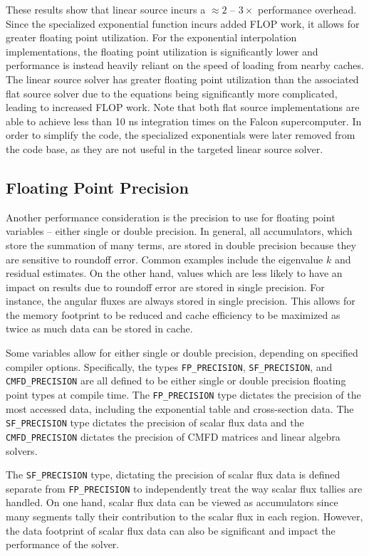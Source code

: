 These results show that linear source incurs a $\approx 2$ -- $3\times$ performance overhead. Since the specialized exponential function incurs added \ac{FLOP} work, it allows for greater floating point utilization. For the exponential interpolation implementations, the floating point utilization is significantly lower and performance is instead heavily reliant on the speed of loading from nearby caches. The linear source solver has greater floating point utilization than the associated flat source solver due to the equations being significantly more complicated, leading to increased \ac{FLOP} work. Note that both flat source implementations are able to achieve less than 10 ns integration times on the Falcon supercomputer. In order to simplify the code, the specialized exponentials were later removed from the code base, as they are not useful in the targeted linear source solver.


\subsection{Floating Point Precision}

Another performance consideration is the precision to use for floating point variables -- either single or double precision. In general, all accumulators, which store the summation of many terms, are stored in double precision because they are sensitive to roundoff error. Common examples include the eigenvalue $k$ and residual estimates. On the other hand, values which are less likely to have an impact on results due to roundoff error are stored in single precision.  For instance, the angular fluxes are always stored in single precision. This allows for the memory footprint to be reduced and cache efficiency to be maximized as twice as much data can be stored in cache.

Some variables allow for either single or double precision, depending on specified compiler options. Specifically, the types \texttt{FP_PRECISION}, \texttt{SF_PRECISION}, and \newline \texttt{CMFD_PRECISION} are all defined to be either single or double precision floating point types at compile time. The \texttt{FP_PRECISION} type dictates the precision of the most accessed data, including the exponential table and cross-section data.  The \texttt{SF_PRECISION} type dictates the precision of scalar flux data and the \texttt{CMFD_PRECISION} dictates the precision of CMFD matrices and linear algebra solvers.

The \texttt{SF_PRECISION} type, dictating the precision of scalar flux data is defined separate from \texttt{FP_PRECISION} to independently treat the way scalar flux tallies are handled. On one hand, scalar flux data can be viewed as accumulators since many segments tally their contribution to the scalar flux in each region. However, the data footprint of scalar flux data can also be significant and impact the performance of the solver.

